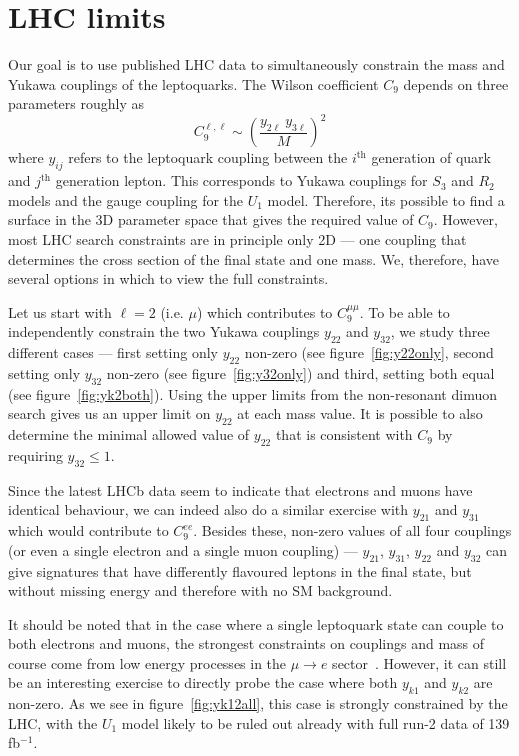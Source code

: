 \documentclass[12pt]{revtex4-2}
\numberwithin{equation}{section}
\begin{document}

\section{LHC limits}

\label{sec:limits}


Our goal is to use published LHC data to simultaneously constrain the mass and Yukawa couplings of the leptoquarks.   The Wilson coefficient $C_9$ depends on three parameters roughly as 
\[
C_9^{\ell,\ell} \sim \left(\frac{y_{2 \ell}~y_{3 \ell}}{M}\right)^2
\]
where $y_{ij}$ refers to the leptoquark coupling between the $i^\mathrm{th}$ generation of quark and $j^\mathrm{th}$ generation lepton.  This corresponds to Yukawa couplings for $S_3$ and $R_2$ models and the gauge coupling for the $U_1$ model.  Therefore, its possible to find a surface in the 3D parameter space that gives the required value of $C_9$.  However, most LHC search constraints are in principle only 2D --- one coupling that determines the cross section of the final state and one mass.  We, therefore, have several options in which to view the full constraints.  

Let us start with $\ell = 2$ (i.e. $\mu$) which contributes to $C_9^{\mu \mu}$.  To be able to independently constrain the two Yukawa couplings $y_{22}$ and $y_{32}$, we study three different cases --- first setting only $y_{22}$ non-zero (see figure~\ref{fig:y22only}, second setting only $y_{32}$ non-zero (see figure~\ref{fig:y32only}) and third, setting both equal (see figure~\ref{fig:yk2both}).  Using the upper limits from the non-resonant dimuon search gives us an upper limit on $y_{22}$ at each mass value.  It is  possible to also determine the  minimal allowed value of $y_{22}$ that is consistent with $C_9$ by requiring $y_{32} \leq 1$.  

Since the latest LHCb data seem to indicate that electrons and muons have identical behaviour, we can indeed also do a similar exercise with $y_{21}$ and $y_{31}$ which would contribute to $C_9^{e e}$.  Besides these, non-zero values of all four couplings (or even a single electron and a single muon coupling) --- $y_{21}$, $y_{31}$, $y_{22}$ and $y_{32}$  can give signatures that have differently flavoured leptons in the final state, but without missing energy and therefore with no SM background.  

It should be noted that in the case where a single leptoquark state can couple to both electrons and muons, the strongest constraints on couplings and mass of course come from low energy processes in the $\mu \rightarrow e$ sector~\cite{MEG:2013oxv, SINDRUM:1987nra, SINDRUMII:1993gxf}.  However, it can still be an interesting exercise to directly probe the case where both $y_{k1}$ and $y_{k2}$ are non-zero.  As we see in figure~\ref{fig:yk12all}, this case is strongly constrained by the LHC, with the $U_1$ model likely to be ruled out already with full run-2 data of 139 fb$^{-1}$.
\end{document}
